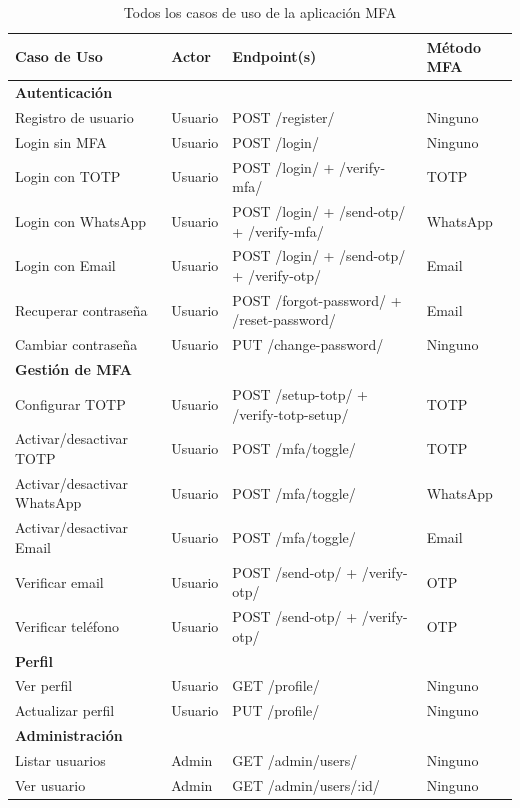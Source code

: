 \documentclass[12pt,a4paper,openany]{article}
\begin{document}
\begin{table}[H]
\centering
\caption{Todos los casos de uso de la aplicación MFA}
\begin{tabular}{@{}p{4.5cm}p{3cm}p{3cm}p{3cm}@{}}
\toprule
\textbf{Caso de Uso} & \textbf{Actor} & \textbf{Endpoint(s)} & \textbf{Método MFA} \\
\midrule
\multicolumn{4}{l}{\textbf{\textcolor{primary}{Autenticación}}} \\
\midrule
Registro de usuario & Usuario & POST /register/ & Ninguno \\
Login sin MFA & Usuario & POST /login/ & Ninguno \\
Login con TOTP & Usuario & POST /login/ + /verify-mfa/ & TOTP \\
Login con WhatsApp & Usuario & POST /login/ + /send-otp/ + /verify-mfa/ & WhatsApp \\
Login con Email & Usuario & POST /login/ + /send-otp/ + /verify-otp/ & Email \\
Recuperar contraseña & Usuario & POST /forgot-password/ + /reset-password/ & Email \\
Cambiar contraseña & Usuario & PUT /change-password/ & Ninguno \\
\midrule
\multicolumn{4}{l}{\textbf{\textcolor{primary}{Gestión de MFA}}} \\
\midrule
Configurar TOTP & Usuario & POST /setup-totp/ + /verify-totp-setup/ & TOTP \\
Activar/desactivar TOTP & Usuario & POST /mfa/toggle/ & TOTP \\
Activar/desactivar WhatsApp & Usuario & POST /mfa/toggle/ & WhatsApp \\
Activar/desactivar Email & Usuario & POST /mfa/toggle/ & Email \\
Verificar email & Usuario & POST /send-otp/ + /verify-otp/ & OTP \\
Verificar teléfono & Usuario & POST /send-otp/ + /verify-otp/ & OTP \\
\midrule
\multicolumn{4}{l}{\textbf{\textcolor{primary}{Perfil}}} \\
\midrule
Ver perfil & Usuario & GET /profile/ & Ninguno \\
Actualizar perfil & Usuario & PUT /profile/ & Ninguno \\
\midrule
\multicolumn{4}{l}{\textbf{\textcolor{primary}{Administración}}} \\
\midrule
Listar usuarios & Admin & GET /admin/users/ & Ninguno \\
Ver usuario & Admin & GET /admin/users/:id/ & Ninguno \\

\end{tabular}
\end{table}
\end{document}
